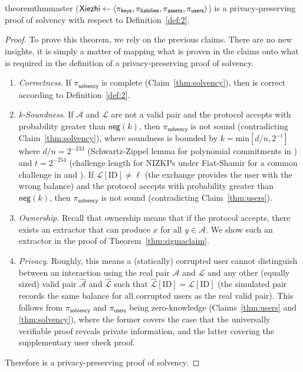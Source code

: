 
\section{\Sys}

\begin{restatable}{theorem}{thmmaster}
\label{thm:master}
\Sys ($\textsf{Xiezhi}\leftarrow\langle \pi_\mathsf{keys}, \pi_\mathsf{liabilies}, \pi_\mathsf{assets}, \pi_\mathsf{users} \rangle$) is a privacy-preserving proof of solvency with respect to Definition~\ref{def:2}. 
\end{restatable}

\begin{proof}
To prove this theorem, we rely on the previous claims. There are no new insights, it is simply a matter of mapping what is proven in the claims onto what is required in the definition of a privacy-preserving proof of solvency.
\begin{enumerate}
    \item \textit{Correctness}. If $\pi_\mathsf{solvency}$ is complete (Claim~\ref{thm:solvency}), then \Sys is correct according to Definition~\ref{def:2}.
    \item \textit{k-Soundness}. If $\mathcal{A}$ and $\mathcal{L}$ are not a valid pair and the protocol accepts with probability greater than $\mathsf{neg}(k)$, then $\pi_\mathsf{solvency}$ is not sound (contradicting Claim~\ref{thm:solvency}), where soundness is bounded by $k=\mathrm{min}[d/n,2^{-t}]$ where $d/n=2^{-233}$ (Schwartz-Zippel lemma for polynomial commitments in \bls) and $t=2^{-254}$ (challenge length for NIZKPs under Fiat-Shamir for a common challenge in \secp and \bls). If $\mathcal{L}[\text{ID}] \neq \ell$ (\ie the exchange provides the user with the wrong balance) and the protocol accepts with probability greater than $\mathsf{neg}(k)$, then $\pi_\mathsf{solvency}$ is not sound (contradicting Claim~\ref{thm:users}).
    \item \textit{Ownership}. Recall that ownership means that if the protocol accepts, there exists an extractor that can produce $x$ for all $y \in \mathcal{A}$. We show such an extractor in the proof of Theorem~\ref{thm:sigmaclaim}.
    \item \textit{Privacy}. Roughly, this means a (statically) corrupted user cannot distinguish between an interaction using the real pair $\mathcal{A}$ and $\mathcal{L}$ and any other (equally sized) valid pair $\hat{\mathcal{A}}$ and $\hat{\mathcal{L}}$ such that $\hat{\mathcal{L}}[\text{ID}] = \mathcal{L}[\text{ID}]$ (\ie the simulated pair records the same balance for all corrupted users as the real valid pair). This follows from $\pi_\mathsf{solvency}$ and $\pi_\mathsf{users}$ being zero-knowledge (Claims~\ref{thm:users} and \ref{thm:solvency}), where the former covers the case that the universally verifiable proof reveals private information, and the latter covering the supplementary user check proof. 
\end{enumerate}
Therefore \Sys is a privacy-preserving proof of solvency.
\end{proof}

